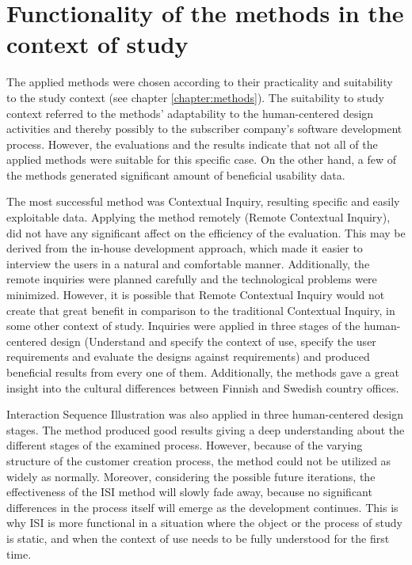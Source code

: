 \documentclass[12pt,a4paper,oneside,pdftex]{report}
\begin{document}
\section{Functionality of the methods in the context of study}
The applied methods were chosen according to their practicality and suitability to the study context (see chapter \ref{chapter:methods}). The suitability to study context referred to the methods' adaptability to the human-centered design activities and thereby possibly to the subscriber company's software development process. However, the evaluations and the results indicate that not all of the applied methods were suitable for this specific case. On the other hand, a few of the methods generated significant amount of beneficial usability data. 

The most successful method was Contextual Inquiry, resulting specific and easily exploitable data. Applying the method remotely (Remote Contextual Inquiry), did not have any significant affect on the efficiency of the evaluation. This may be derived from the in-house development approach, which made it easier to interview the users in a natural and comfortable manner. Additionally, the remote inquiries were planned carefully and the technological problems were minimized. However, it is possible that Remote Contextual Inquiry would not create that great benefit in comparison to the traditional Contextual Inquiry, in some other context of study. Inquiries were applied in three stages of the human-centered design (Understand and specify the context of use, specify the user requirements and evaluate the designs against requirements) and produced beneficial results from every one of them. Additionally, the methods gave a great insight into the cultural differences between Finnish and Swedish country offices.

Interaction Sequence Illustration was also applied in three human-centered design stages. The method produced good results giving a deep understanding about the different stages of the examined process. However, because of the varying structure of the customer creation process, the method could not be utilized as widely as normally. Moreover, considering the possible future iterations, the effectiveness of the ISI method will slowly fade away, because no significant differences in the process itself will emerge as the development continues. This is why ISI is more functional in a situation where the object or the process of study is static, and when the context of use needs to be fully understood for the first time. 
\end{document}
